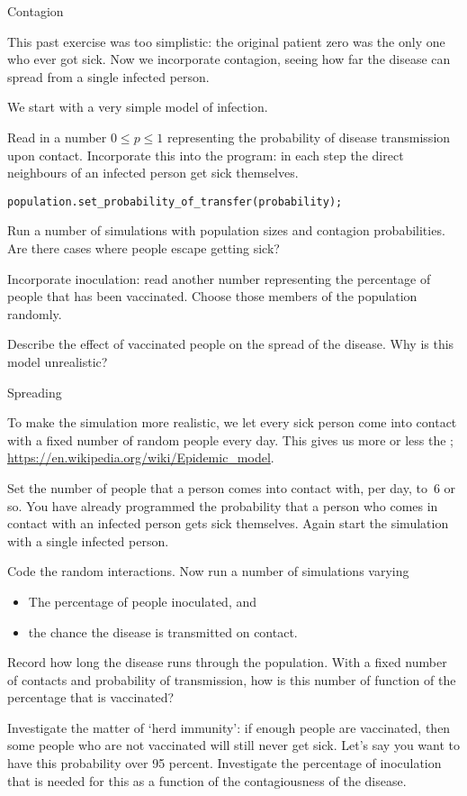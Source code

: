  {Contagion}

This past exercise was too simplistic: the original patient zero was
the only one who ever got sick.
Now we incorporate contagion, seeing how far the disease can spread
from a single infected person.

We start with a very simple model of infection.

\begin{exercise}
  \label{ex:infect:1}
  Read in a number $0\leq p \leq 1$ representing the probability of
  disease transmission upon contact. Incorporate this into the
  program: in each step the direct neighbours of an infected person
  get sick themselves.
\begin{verbatim}
population.set_probability_of_transfer(probability);  
\end{verbatim}
  Run a number of simulations with population sizes and contagion
  probabilities. Are there cases where people escape getting sick?
\end{exercise}

\begin{exercise}
  \label{ex:infect:2}
  Incorporate inoculation: read another number representing the
  percentage of people that has been vaccinated. Choose those members
  of the population randomly.

  Describe the effect of vaccinated people on the spread of the
  disease. Why is this model unrealistic?
\end{exercise}

 {Spreading}

To make the simulation more realistic, we let every sick person come
into contact with a fixed number of random people every day. This
gives us more or less the ;
\url{https://en.wikipedia.org/wiki/Epidemic_model}.

Set the number of people that a person comes into contact with, per
day, to~6 or so. You have already programmed the probability that a
person who comes in contact with an infected person gets sick themselves.
Again start the simulation with a single infected person.

\begin{exercise}
  \label{ex:infect:3}
  Code the random interactions. Now run a number of simulations varying
  \begin{itemize}
  \item The percentage of people inoculated, and
  \item the chance the disease is transmitted on contact.
  \end{itemize}
  Record how long the disease runs through the population. With a
  fixed number of contacts and probability of transmission, how is
  this number of function of the percentage that is vaccinated?

  Investigate the matter of `herd immunity': if enough people are
  vaccinated, then some people who are not vaccinated will still never get
  sick. Let's say you want to have this probability over 95
  percent. Investigate the percentage of inoculation that is needed
  for this as a function of the contagiousness of the disease.
\end{exercise}

